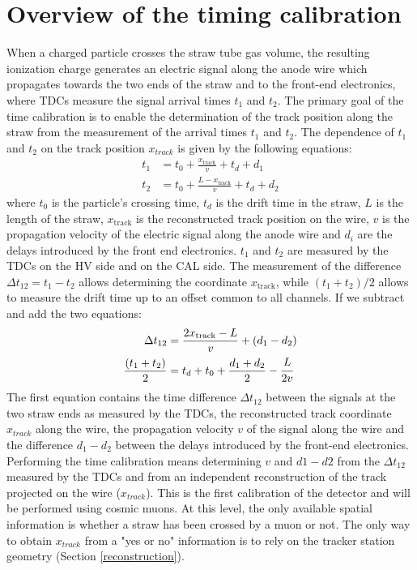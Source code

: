 \section{Overview of the timing calibration}
When a charged particle crosses the straw tube 
gas volume, the resulting ionization charge 
generates an electric signal along the anode  
wire which propagates towards the two ends of 
the straw and to the front-end electronics, 
where TDCs measure the signal arrival 
times $t_1$ and $t_2$. The primary goal of 
the time calibration is to enable the 
determination of the track position 
along the straw from the measurement of 
the arrival times $t_1$ and $t_2$. 
The dependence of $t_1$ and $t_2$ on the track 
position $x_{track}$ is given by the following equations:
\begin{equation}
\begin{aligned}
    t_1 &= t_0 + \frac{x_{\text{track}}}{v} + t_d + d_1 \\
    t_2 &= t_0 + \frac{L - x_{\text{track}}}{v} + t_d + d_2
\end{aligned}
\end{equation}
where $t_0$ is the particle's crossing time, 
$t_d$ is the drift time in the straw, 
$L$ is the length of the straw, 
$x_{\text{track}}$ is the 
reconstructed track position on the wire, $v$ 
is the propagation velocity of 
the electric signal along the anode 
wire and $d_i$ are the delays  
introduced by the front end electronics. 
$t_1$ and $t_2$ are measured  
by the TDCs on the HV side and on the CAL side.
The measurement of the difference 
$\Delta t_{12}=t_1-t_2$ allows 
determining the coordinate $x_{\text{track}}$, 
while $(t_1 + t_2) / 2$ allows to measure the drift time  
up to an offset common to all channels. 
If we subtract and add the two equations:
\begin{equation}\label{ffffff}
    \begin{aligned}
        \Delta t_{12} &= \frac{2x_{\text{track}}-L}{v} +(d_1-d_2)  \\
        \frac{(t_1 + t_2)}{2} &= t_d+t_0+\frac{d_1+d_2}{2}-\cfrac{L}{2v} 
    \end{aligned}
    \end{equation}
The first equation contains the time 
difference $\Delta t_{12}$ between the 
signals at the two straw ends as measured 
by the TDCs, the reconstructed track coordinate 
$x_{track}$ along the wire, the propagation  
velocity $v$ of the signal along the wire and 
the difference $d_1-d_2$ between the delays introduced by 
the front-end electronics. 
Performing the time calibration means 
determining $v$ and $d1-d2$ from the $\Delta t_{12}$ 
measured by the TDCs and from an independent 
reconstruction of the track 
projected on the wire ($x_{track}$).
This is the first calibration of the detector and 
will be performed using cosmic muons. 
At this level, the only available spatial 
information is whether a straw has been crossed 
by a muon or not. The 
only way to obtain $x_{track}$ from a "yes or no" 
information is to rely on the tracker station 
geometry (Section \ref{reconstruction}).

